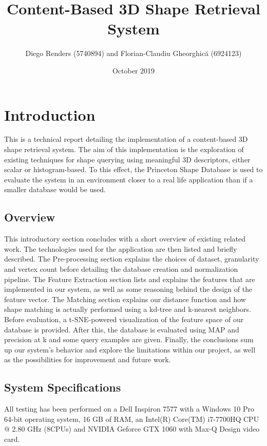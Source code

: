\documentclass{bigdata}
\title{Content-Based 3D Shape Retrieval System}
\author{Diego Renders (5740894) and Florian-Claudiu Gheorghică (6924123)}
\date{October 2019}
\begin{document}
\setlength{\cftbeforesecskip}{1pt}
\maketitle

\newpage

\tableofcontents

\section{Introduction}

This is a technical report detailing the implementation of a content-based 3D shape retrieval system. The aim of this implementation is the exploration of existing techniques for shape querying using meaningful 3D descriptors, either scalar or histogram-based. To this effect, the Princeton Shape Database is used to evaluate the system in an environment closer to a real life application than if a smaller database would be used.

\subsection{Overview}
This introductory section concludes with a short overview of existing related work. The technologies used for the application are then listed and briefly described. The Pre-processing section explains the choices of dataset, granularity and vertex count before detailing the database creation and normalization pipeline. The Feature Extraction section lists and explains the features that are implemented in our system, as well as some reasoning behind the design of the feature vector. The Matching section explains our distance function and how shape matching is actually performed using a kd-tree and k-nearest neighbors. Before evaluation, a t-SNE-powered visualization of the feature space of our database is provided. After this, the database is evaluated using MAP and precision at k and some query examples are given. Finally, the conclusions sum up our system's behavior and explore the limitations within our project, as well as the possibilities for improvement and future work.

\subsection{System Specifications}
All testing has been performed on a Dell Inspiron 7577 with a Windows 10 Pro 64-bit operating system, 16 GB of RAM, an Intel(R) Core(TM) i7-7700HQ CPU @ 2.80 GHz (8CPUs) and NVIDIA Geforce GTX 1060 with Max-Q Design video card.
\end{document}
